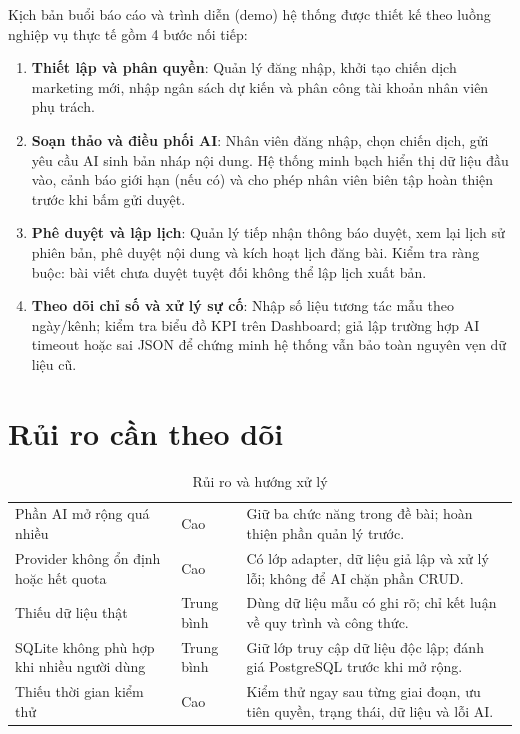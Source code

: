 Kịch bản buổi báo cáo và trình diễn (demo) hệ thống được thiết kế theo luồng nghiệp vụ thực tế gồm 4 bước nối tiếp:
\begin{enumerate}
\item \textbf{Thiết lập và phân quyền}: Quản lý đăng nhập, khởi tạo chiến dịch marketing mới, nhập ngân sách dự kiến và phân công tài khoản nhân viên phụ trách.
\item \textbf{Soạn thảo và điều phối AI}: Nhân viên đăng nhập, chọn chiến dịch, gửi yêu cầu AI sinh bản nháp nội dung. Hệ thống minh bạch hiển thị dữ liệu đầu vào, cảnh báo giới hạn (nếu có) và cho phép nhân viên biên tập hoàn thiện trước khi bấm gửi duyệt.
\item \textbf{Phê duyệt và lập lịch}: Quản lý tiếp nhận thông báo duyệt, xem lại lịch sử phiên bản, phê duyệt nội dung và kích hoạt lịch đăng bài. Kiểm tra ràng buộc: bài viết chưa duyệt tuyệt đối không thể lập lịch xuất bản.
\item \textbf{Theo dõi chỉ số và xử lý sự cố}: Nhập số liệu tương tác mẫu theo ngày/kênh; kiểm tra biểu đồ KPI trên Dashboard; giả lập trường hợp AI timeout hoặc sai JSON để chứng minh hệ thống vẫn bảo toàn nguyên vẹn dữ liệu cũ.
\end{enumerate}

\section{Rủi ro cần theo dõi}\label{sec:v8-risks}

\begin{table}[h!]
\centering
\small
\caption{Rủi ro và hướng xử lý}
\label{tab:v8-risks}
\begin{tabularx}{\textwidth}{|L{3.8cm}|C{2.0cm}|Y|}
\hline
{} &  & \\
\hline
Phần AI mở rộng quá nhiều & Cao & Giữ ba chức năng trong đề bài; hoàn thiện phần quản lý trước.\\
\hline
Provider không ổn định hoặc hết quota & Cao & Có lớp adapter, dữ liệu giả lập và xử lý lỗi; không để AI chặn phần CRUD.\\
\hline
Thiếu dữ liệu thật & Trung bình & Dùng dữ liệu mẫu có ghi rõ; chỉ kết luận về quy trình và công thức.\\
\hline
SQLite không phù hợp khi nhiều người dùng & Trung bình & Giữ lớp truy cập dữ liệu độc lập; đánh giá PostgreSQL trước khi mở rộng.\\
\hline
Thiếu thời gian kiểm thử & Cao & Kiểm thử ngay sau từng giai đoạn, ưu tiên quyền, trạng thái, dữ liệu và lỗi AI.\\
\hline
\end{tabularx}
\end{table}


